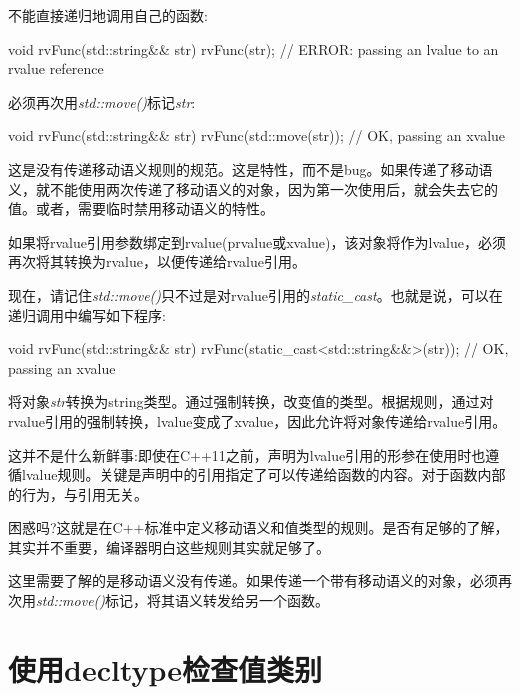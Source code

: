 不能直接递归地调用自己的函数:\par

\begin{codebox}[cpp]
void rvFunc(std::string&& str) {
  rvFunc(str); // ERROR: passing an lvalue to an rvalue reference
}
\end{codebox}

必须再次用\textit{std::move()}标记\textit{str}:\par

\begin{codebox}[cpp]
void rvFunc(std::string&& str) {
  rvFunc(std::move(str)); // OK, passing an xvalue
}
\end{codebox}

这是没有传递移动语义规则的规范。这是特性，而不是bug。如果传递了移动语义，就不能使用两次传递了移动语义的对象，因为第一次使用后，就会失去它的值。或者，需要临时禁用移动语义的特性。\par

如果将rvalue引用参数绑定到rvalue(prvalue或xvalue)，该对象将作为lvalue，必须再次将其转换为rvalue，以便传递给rvalue引用。\par

现在，请记住\textit{std::move()}只不过是对rvalue引用的\textit{static\_\allowbreak{}cast}。也就是说，可以在递归调用中编写如下程序:\par

\begin{codebox}[cpp]
void rvFunc(std::string&& str) {
  rvFunc(static_cast<std::string&&>(str)); // OK, passing an xvalue
}
\end{codebox}

将对象\textit{str}转换为string类型。通过强制转换，改变值的类型。根据规则，通过对rvalue引用的强制转换，lvalue变成了xvalue，因此允许将对象传递给rvalue引用。\par

这并不是什么新鲜事:即使在C++11之前，声明为lvalue引用的形参在使用时也遵循lvalue规则。关键是声明中的引用指定了可以传递给函数的内容。对于函数内部的行为，与引用无关。\par

困惑吗?这就是在C++标准中定义移动语义和值类型的规则。是否有足够的了解，其实并不重要，编译器明白这些规则其实就足够了。\par

这里需要了解的是移动语义没有传递。如果传递一个带有移动语义的对象，必须再次用\textit{std::move()}标记，将其语义转发给另一个函数。\par


\section{使用decltype检查值类别}

